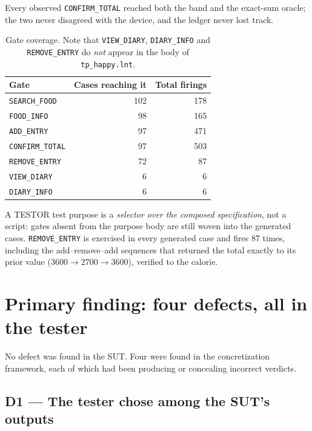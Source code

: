 \documentclass[11pt,a4paper]{article}
\newcommand{\gate}[1]{\texttt{\small #1}}
\newcommand{\dref}[1]{\textbf{D#1}}
\begin{document}
Every observed \gate{CONFIRM\_TOTAL} reached both the band and the exact-sum
oracle; the two never disagreed with the device, and the ledger never lost track.

\begin{table}[h]
\centering\footnotesize
\caption{Gate coverage. Note that \gate{VIEW\_DIARY}, \gate{DIARY\_INFO} and
\gate{REMOVE\_ENTRY} do \emph{not} appear in the body of \texttt{tp\_happy.lnt}.}
\label{tab:coverage}
\begin{tabular}{@{}lrr@{}}
\toprule
\textbf{Gate} & \textbf{Cases reaching it} & \textbf{Total firings} \\
\midrule
\gate{SEARCH\_FOOD} & 102 & 178 \\
\gate{FOOD\_INFO} & 98 & 165 \\
\gate{ADD\_ENTRY} & 97 & 471 \\
\gate{CONFIRM\_TOTAL} & 97 & 503 \\
\gate{REMOVE\_ENTRY} & 72 & 87 \\
\gate{VIEW\_DIARY} & 6 & 6 \\
\gate{DIARY\_INFO} & 6 & 6 \\
\bottomrule
\end{tabular}
\end{table}

\noindent A TESTOR test purpose is a \emph{selector over the composed
specification}, not a script: gates absent from the purpose body are still woven
into the generated cases. \gate{REMOVE\_ENTRY} is exercised in every generated case
and fires 87 times, including the add--remove--add sequences that returned the
total exactly to its prior value ($3600 \rightarrow 2700 \rightarrow 3600$),
verified to the calorie.

\section{Primary finding: four defects, all in the tester}
\label{sec:defects}

No defect was found in the SUT. Four were found in the concretization framework,
each of which had been producing or concealing incorrect verdicts.

\subsection*{\dref{1} --- The tester chose among the SUT's outputs}
\end{document}
